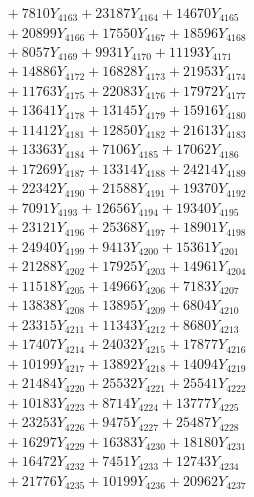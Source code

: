 \documentclass[a4paper,10pt]{article}
\begin{document}
{\begin{align}
&\;  + 7810 Y_{4163} + 23187 Y_{4164} + 14670 Y_{4165} \\[0.3ex]
&\;  + 20899 Y_{4166} + 17550 Y_{4167} + 18596 Y_{4168} \\[0.5ex]\allowbreak
&\;  + 8057 Y_{4169} + 9931 Y_{4170} + 11193 Y_{4171} \\[0.3ex]
&\;  + 14886 Y_{4172} + 16828 Y_{4173} + 21953 Y_{4174} \\[0.3ex]
&\;  + 11763 Y_{4175} + 22083 Y_{4176} + 17972 Y_{4177} \\[0.3ex]
&\;  + 13641 Y_{4178} + 13145 Y_{4179} + 15916 Y_{4180} \\[0.3ex]
&\;  + 11412 Y_{4181} + 12850 Y_{4182} + 21613 Y_{4183} \\[0.3ex]
&\;  + 13363 Y_{4184} + 7106 Y_{4185} + 17062 Y_{4186} \\[0.3ex]
&\;  + 17269 Y_{4187} + 13314 Y_{4188} + 24214 Y_{4189} \\[0.3ex]
&\;  + 22342 Y_{4190} + 21588 Y_{4191} + 19370 Y_{4192} \\[0.3ex]
&\;  + 7091 Y_{4193} + 12656 Y_{4194} + 19340 Y_{4195} \\[0.3ex]
&\;  + 23121 Y_{4196} + 25368 Y_{4197} + 18901 Y_{4198} \\[0.5ex]\allowbreak
&\;  + 24940 Y_{4199} + 9413 Y_{4200} + 15361 Y_{4201} \\[0.3ex]
&\;  + 21288 Y_{4202} + 17925 Y_{4203} + 14961 Y_{4204} \\[0.3ex]
&\;  + 11518 Y_{4205} + 14966 Y_{4206} + 7183 Y_{4207} \\[0.3ex]
&\;  + 13838 Y_{4208} + 13895 Y_{4209} + 6804 Y_{4210} \\[0.3ex]
&\;  + 23315 Y_{4211} + 11343 Y_{4212} + 8680 Y_{4213} \\[0.3ex]
&\;  + 17407 Y_{4214} + 24032 Y_{4215} + 17877 Y_{4216} \\[0.3ex]
&\;  + 10199 Y_{4217} + 13892 Y_{4218} + 14094 Y_{4219} \\[0.3ex]
&\;  + 21484 Y_{4220} + 25532 Y_{4221} + 25541 Y_{4222} \\[0.3ex]
&\;  + 10183 Y_{4223} + 8714 Y_{4224} + 13777 Y_{4225} \\[0.3ex]
&\;  + 23253 Y_{4226} + 9475 Y_{4227} + 25487 Y_{4228} \\[0.5ex]\allowbreak
&\;  + 16297 Y_{4229} + 16383 Y_{4230} + 18180 Y_{4231} \\[0.3ex]
&\;  + 16472 Y_{4232} + 7451 Y_{4233} + 12743 Y_{4234} \\[0.3ex]
&\;  + 21776 Y_{4235} + 10199 Y_{4236} + 20962 Y_{4237} \\[0.3ex]

\end{align}}
\end{document}
